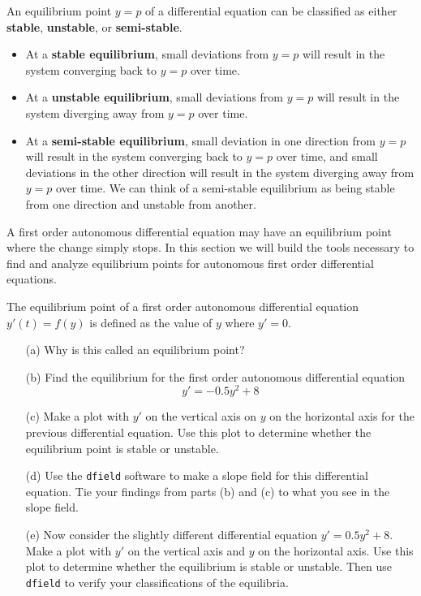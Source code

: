 \begin{definition}[Stability]
    An equilibrium point $y=p$ of a differential equation can be classified as either {\bf
    stable}, {\bf unstable}, or {\bf semi-stable}.  
    \begin{itemize}
        \item At a {\bf stable equilibrium}, small deviations from $y=p$ will result in the
            system converging back to $y=p$ over time.
        \item At a {\bf unstable equilibrium}, small deviations from $y=p$ will result in the
            system diverging away from $y=p$ over time.
        \item At a {\bf semi-stable equilibrium}, small deviation in one direction from
            $y=p$ will result in the system converging back to $y=p$ over time, and small
            deviations in the other direction will result in the system diverging away
            from $y=p$ over time.  We can think of a semi-stable equilibrium as being
            stable from one direction and unstable from another.
    \end{itemize}
\end{definition}


A first order autonomous differential equation may have an equilibrium point where the
change simply stops.  In this section we will build the tools necessary to
find and analyze equilibrium points for autonomous first order differential equations.

\begin{problem}
    The equilibrium point of a first order autonomous differential equation $y'(t) = f(y)$ is defined as
    the value of $y$ where $y'=0$.  
    \begin{itemize}
        \item[(a)] Why is this called an equilibrium point?
        \item[(b)] Find the equilibrium for the first order autonomous differential equation
            \[ y' = -0.5y^2 + 8 \]
        \item[(c)] Make a plot with $y'$ on the vertical axis on $y$ on the horizontal axis for
            the previous differential equation.  Use this plot to determine whether the
            equilibrium point is stable or unstable.
        \item[(d)] Use the \texttt{dfield} software to make a slope field for this
            differential equation.  Tie your findings from parts (b) and (c) to what you
            see in the slope field.
        \item[(e)] Now consider the slightly different differential equation $y' = 0.5 y^2
            + 8$.  Make a plot with $y'$ on the vertical axis and $y$ on the horizontal
            axis.  Use this plot to determine whether the equilibrium is stable or
            unstable.  Then use \texttt{dfield} to verify your classifications of the
            equilibria.
    \end{itemize}
\end{problem}


